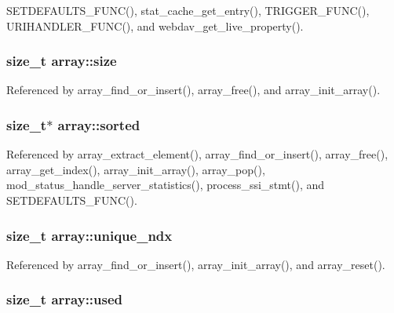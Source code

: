 S\-E\-T\-D\-E\-F\-A\-U\-L\-T\-S\-\_\-\-F\-U\-N\-C(), stat\-\_\-cache\-\_\-get\-\_\-entry(), T\-R\-I\-G\-G\-E\-R\-\_\-\-F\-U\-N\-C(), U\-R\-I\-H\-A\-N\-D\-L\-E\-R\-\_\-\-F\-U\-N\-C(), and webdav\-\_\-get\-\_\-live\-\_\-property().

\hypertarget{structarray_a223f5760985fe124132e794b6e3e1a64}{
\subsubsection[{size}]{\setlength{\rightskip}{0pt plus 5cm}size\-\_\-t array\-::size}}\label{structarray_a223f5760985fe124132e794b6e3e1a64}


Referenced by array\-\_\-find\-\_\-or\-\_\-insert(), array\-\_\-free(), and array\-\_\-init\-\_\-array().

\hypertarget{structarray_a808e210b6e5be6f238cf06727f4ef757}{
\subsubsection[{sorted}]{\setlength{\rightskip}{0pt plus 5cm}size\-\_\-t$\ast$ array\-::sorted}}\label{structarray_a808e210b6e5be6f238cf06727f4ef757}


Referenced by array\-\_\-extract\-\_\-element(), array\-\_\-find\-\_\-or\-\_\-insert(), array\-\_\-free(), array\-\_\-get\-\_\-index(), array\-\_\-init\-\_\-array(), array\-\_\-pop(), mod\-\_\-status\-\_\-handle\-\_\-server\-\_\-statistics(), process\-\_\-ssi\-\_\-stmt(), and S\-E\-T\-D\-E\-F\-A\-U\-L\-T\-S\-\_\-\-F\-U\-N\-C().

\hypertarget{structarray_af86dee9c05aa7a91196b9d8a0a42d1fd}{
\subsubsection[{unique\-\_\-ndx}]{\setlength{\rightskip}{0pt plus 5cm}size\-\_\-t array\-::unique\-\_\-ndx}}\label{structarray_af86dee9c05aa7a91196b9d8a0a42d1fd}


Referenced by array\-\_\-find\-\_\-or\-\_\-insert(), array\-\_\-init\-\_\-array(), and array\-\_\-reset().

\hypertarget{structarray_a83a03fea6f802526509b398c24013d5b}{
\subsubsection[{used}]{\setlength{\rightskip}{0pt plus 5cm}size\-\_\-t array\-::used}}\label{structarray_a83a03fea6f802526509b398c24013d5b}


